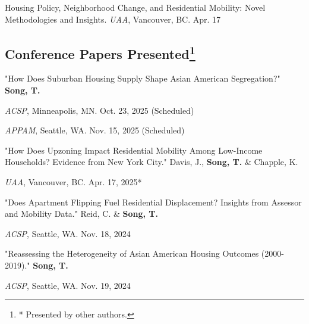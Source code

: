 \documentclass[11pt,letterpaper]{report}
\newcommand{\listitemspace}{0.4em}
\renewenvironment{itemize}
{\begin{list}{}{\setlength{\leftmargin}{0.5em}
\setlength{\parskip}{0em}
\setlength{\itemsep}{\listitemspace}
\setlength{\parsep}{\listitemspace}}}
{\end{list}}
\begin{document}
\begin{tablist}
\item[2025] \tab{}Housing Policy, Neighborhood Change, and Residential Mobility: Novel Methodologies and Insights. \emph{UAA}, Vancouver, BC. Apr. 17
\end{tablist}

\subsection*{Conference Papers Presented\footnote{ * Presented by other authors.}}

\begin{itemize}
\setlength{\itemsep}{-0.0em}  %

\item "How Does Suburban Housing Supply Shape Asian American Segregation?" \textbf{Song, T.}
\begin{itemize}
\addtolength{\leftskip}{1em} 
\setlength{\itemsep}{-0.4em}
\item[•] \emph{ACSP}, Minneapolis, MN. Oct. 23, 2025 (Scheduled)
\item[•] \emph{APPAM}, Seattle, WA. Nov. 15, 2025 (Scheduled)
\end{itemize}

\item "How Does Upzoning Impact Residential Mobility Among Low-Income Households? Evidence from New York City." Davis, J., \textbf{Song, T.} \& Chapple, K.
\begin{itemize}
\addtolength{\leftskip}{1em} 
\setlength{\itemsep}{-0.4em}
\item[•] \emph{UAA}, Vancouver, BC. Apr. 17, 2025*
\end{itemize}

\item "Does Apartment Flipping Fuel Residential Displacement? Insights from Assessor and Mobility Data." Reid, C. \& \textbf{Song, T.} 
\begin{itemize}
\addtolength{\leftskip}{1em} 
\setlength{\itemsep}{-0.4em}
\item[•] \emph{ACSP}, Seattle, WA. Nov. 18, 2024
\end{itemize}

\item "Reassessing the Heterogeneity of Asian American Housing Outcomes (2000-2019)." \textbf{Song, T.} 
\begin{itemize}
\addtolength{\leftskip}{1em} 
\setlength{\itemsep}{-0.4em}
\item[•] \emph{ACSP}, Seattle, WA. Nov. 19, 2024
\end{itemize}


\end{itemize}
\end{document}
